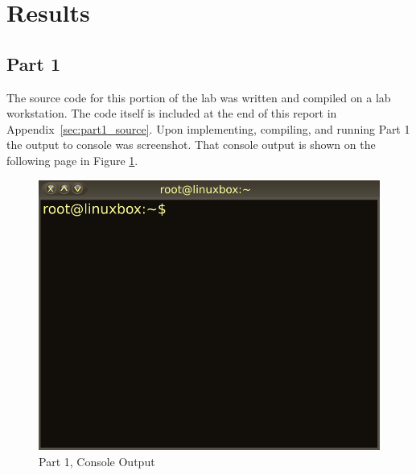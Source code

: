 
\section{Results}\label{sec:results}


    \subsection{Part 1}\label{subsec:part1}
        \lipsum[1]

        \medskip
        \noindent The source code for this portion of the lab was written and compiled on a lab workstation.
        The code itself is included at the end of this report in Appendix~\ref{sec:part1_source}.
        Upon implementing, compiling, and running Part 1 the output to console was screenshot.
        That console output is shown on the following page in Figure \ref{fig:part1_output}.

        \begin{figure}[H]
            \centering
            \includegraphics[width=\linewidth]{figures/lab2_1.png}
            \caption{Part 1, Console Output}
            \label{fig:part1_output}
        \end{figure}
